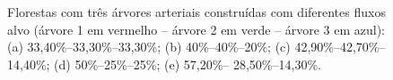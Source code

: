 \begin{figure}[!htb]
  \centering \captiondelim{: }
  \caption{Florestas com três árvores arteriais construídas com diferentes fluxos alvo (árvore 1 em vermelho -- árvore 2 em verde -- árvore 3 em azul): 
  (a) 33,40\%--33,30\%--33,30\%; (b) 40\%--40\%--20\%;  (c) 42,90\%--42,70\%--14,40\%;  (d) 50\%--25\%--25\%;  (e) 57,20\%-- 28,50\%--14,30\%.}
  
  \hspace{12pt}


\end{figure}
